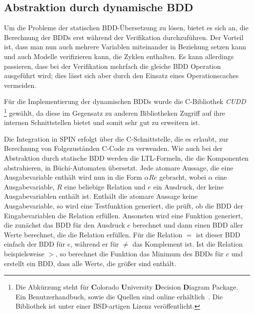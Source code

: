 \subsection{Abstraktion durch dynamische BDD}
Um die Probleme der statischen BDD-Übersetzung zu lösen, bietet es sich an, die Berechnung der BDDs erst während der Verifikation durchzuführen.
Der Vorteil ist, dass man nun auch mehrere Variablen miteinander in Beziehung setzen kann und auch Modelle verifizieren kann, die Zyklen enthalten.
Es kann allerdings passieren, dass bei der Verifikation mehrfach die gleiche BDD Operation ausgeführt wird; dies lässt sich aber durch den Einsatz eines Operationscaches vermeiden.

Für die Implementierung der dynamischen BDDs wurde die C-Bibliothek \emph{CUDD}
\footnote{Die Abkürzung steht für {\bf C}olorado {\bf U}niversity {\bf D}ecision {\bf D}iagram Package.
  Ein Benutzerhandbuch, sowie die Quellen sind online erhältlich~\cite{cudd}.
  Die Bibliothek ist unter einer BSD-artigen Lizenz veröffentlicht.
}
gewählt, da diese im Gegensatz zu anderen Bibliotheken Zugriff auf ihre internen Schnittstellen bietet und somit sehr gut zu erweitern ist.

Die Integration in SPIN erfolgt über die C-Schnittstelle, die es erlaubt, zur Berechnung von Folgezuständen C-Code zu verwenden.
Wie auch bei der Abstraktion durch statische BDD werden die LTL-Formeln, die die Komponenten abstrahieren, in Büchi-Automaten übersetzt.
Jede atomare Aussage, die eine Ausgabevariable enthält wird nun in die Form $\alpha R e$ gebracht, wobei $\alpha$ eine Ausgabevariable, $R$ eine beliebige Relation und $e$ ein Ausdruck, der keine Ausgabevariablen enthält ist.
Enthält die atomare Aussage keine Ausgabevariable, so wird eine Testfunktion generiert, die prüft, ob die BDD der Eingabevariablen die Relation erfüllen.
Ansonsten wird eine Funktion generiert, die zunächst das BDD für den Ausdruck $e$ berechnet und dann einen BDD aller Werte berechnet, die die Relation erfüllen.
Für die Relation $=$ ist dieser BDD einfach der BDD für $e$, während er für $\neq$ das Komplement ist.
Ist die Relation beispielsweise $>$, so berechnet die Funktion das Minimum des BDDs für $e$ und erstellt ein BDD, dass alle Werte, die größer sind enthält.
